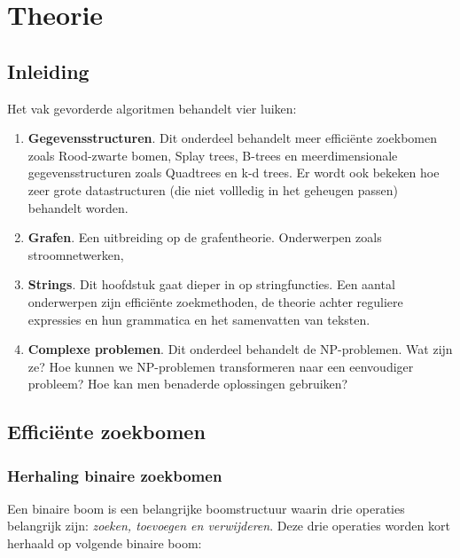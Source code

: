 \documentclass{report}
\begin{document}
	\tableofcontents
	\part{Theorie}
	\chapter{Inleiding}
	Het vak gevorderde algoritmen behandelt vier luiken:
	\begin{enumerate}
		\item \textbf{Gegevensstructuren}. Dit onderdeel behandelt meer efficiënte zoekbomen zoals Rood-zwarte bomen, Splay trees, B-trees en meerdimensionale gegevensstructuren zoals Quadtrees en k-d trees. Er wordt ook bekeken hoe zeer grote datastructuren (die niet vollledig in het geheugen passen) behandelt worden.
		
		\item \textbf{Grafen}. Een uitbreiding op de grafentheorie. Onderwerpen zoals stroomnetwerken, 
		
		\item \textbf{Strings}. Dit hoofdstuk gaat dieper in op stringfuncties. Een aantal onderwerpen zijn efficiënte zoekmethoden, de theorie achter reguliere expressies en hun grammatica en het samenvatten van teksten.
		
		\item \textbf{Complexe problemen}. Dit onderdeel behandelt de NP-problemen. Wat zijn ze? Hoe kunnen we NP-problemen transformeren naar een eenvoudiger probleem? Hoe kan men benaderde oplossingen gebruiken?  
	\end{enumerate}
	\chapter{Efficiënte zoekbomen}
	\section{Herhaling binaire zoekbomen}
	Een binaire boom is een belangrijke boomstructuur waarin drie operaties belangrijk zijn: \textit{zoeken, toevoegen en verwijderen}. Deze drie operaties worden kort herhaald op volgende binaire boom:
	
\end{document}
